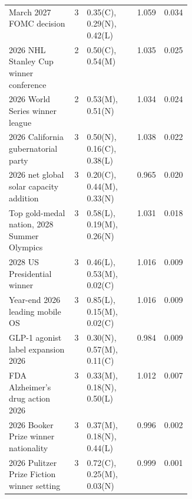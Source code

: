 \begin{longtable}{p{0.36\linewidth} c l r r}
March 2027 FOMC decision & 3 & \scriptsize 0.35(C), 0.29(N), 0.42(L) & 1.059 & 0.034 \\
2026 NHL Stanley Cup winner conference & 2 & \scriptsize 0.50(C), 0.54(M) & 1.035 & 0.025 \\
2026 World Series winner league & 2 & \scriptsize 0.53(M), 0.51(N) & 1.034 & 0.024 \\
2026 California gubernatorial party & 3 & \scriptsize 0.50(N), 0.16(C), 0.38(L) & 1.038 & 0.022 \\
2026 net global solar capacity addition & 3 & \scriptsize 0.20(C), 0.44(M), 0.33(N) & 0.965 & 0.020 \\
Top gold-medal nation, 2028 Summer Olympics & 3 & \scriptsize 0.58(L), 0.19(M), 0.26(N) & 1.031 & 0.018 \\
2028 US Presidential winner & 3 & \scriptsize 0.46(L), 0.53(M), 0.02(C) & 1.016 & 0.009 \\
Year-end 2026 leading mobile OS & 3 & \scriptsize 0.85(L), 0.15(M), 0.02(C) & 1.016 & 0.009 \\
GLP-1 agonist label expansion 2026 & 3 & \scriptsize 0.30(N), 0.57(M), 0.11(C) & 0.984 & 0.009 \\
FDA Alzheimer's drug action 2026 & 3 & \scriptsize 0.33(M), 0.18(N), 0.50(L) & 1.012 & 0.007 \\
2026 Booker Prize winner nationality & 3 & \scriptsize 0.37(M), 0.18(N), 0.44(L) & 0.996 & 0.002 \\
2026 Pulitzer Prize Fiction winner setting & 3 & \scriptsize 0.72(C), 0.25(M), 0.03(N) & 0.999 & 0.001 \\
\end{longtable}